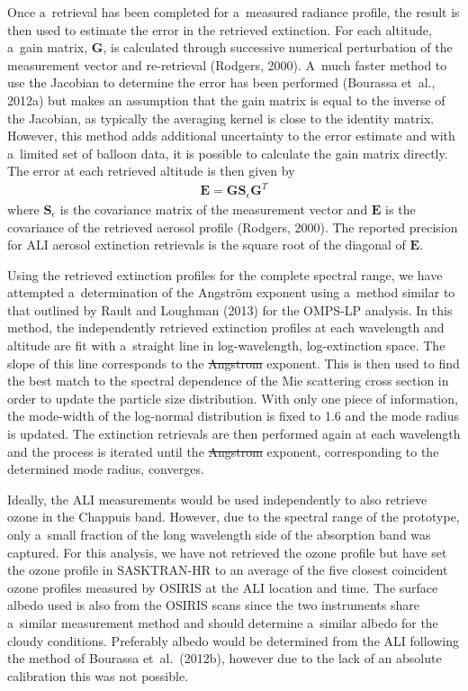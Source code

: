 \documentclass[amtd, online, hvmath]{copernicus}
\providecommand{\DIFadd}[1]{{\protect\color{blue}\uwave{#1}}} %
\providecommand{\DIFdel}[1]{{\protect\color{red}\sout{#1}}}                      %
\providecommand{\DIFaddbegin}{} %
\providecommand{\DIFaddend}{} %
\providecommand{\DIFdelbegin}{} %
\providecommand{\DIFdelend}{} %
\begin{document}
Once a~retrieval has been completed for a~measured radiance profile,
the result is then used to estimate the error in the retrieved
extinction. For each altitude, a~gain matrix, $\mathbf{G}$, is
calculated through successive numerical perturbation of the
measurement vector and re-retrieval (Rodgers, 2000). A~much faster
method to use the Jacobian to determine the error has been performed
(Bourassa et~al., 2012a) but makes an assumption that the gain matrix
is equal to the inverse of the Jacobian, as typically the averaging
kernel is close to the identity matrix. However, this method adds
additional uncertainty to the error estimate and with a~limited set of
balloon data, it is possible to calculate the gain matrix
directly. The error at each retrieved altitude is then given by
\begin{align}
\mathbf{E}=\mathbf{G}\mathbf{S}_{\epsilon} \mathbf{G}^{T}
\end{align}
where $\mathbf{S}_{\epsilon}$ is the covariance matrix of the
measurement vector and $\mathbf{E}$ is the covariance of the retrieved
aerosol profile (Rodgers, 2000). The reported precision for ALI
aerosol extinction retrievals is the square root of the diagonal of
$\mathbf{E}$.

Using the retrieved extinction profiles for the complete spectral
range, we have attempted a~determination of the Angstr\"{o}m exponent
using a~method similar to that outlined by Rault and Loughman (2013)
for the OMPS-LP analysis. In this method, the independently retrieved
extinction profiles at each wavelength and altitude are fit with
a~straight line in log-wavelength, log-extinction space. The slope of
this line corresponds to the \DIFdelbegin \DIFdel{Angstrom }\DIFdelend \DIFaddbegin \DIFadd{Angstr\"{o}m }\DIFaddend exponent. This is then used to
find the best match to the spectral dependence of the Mie scattering
cross section in order to update the particle size distribution. With
only one piece of information, the mode-width of the log-normal
distribution is fixed to 1.6 and the mode radius is updated. The
extinction retrievals are then performed again at each wavelength and
the process is iterated until the \DIFdelbegin \DIFdel{Angstrom }\DIFdelend \DIFaddbegin \DIFadd{Angstr\"{o}m }\DIFaddend exponent, corresponding to
the determined mode radius, converges.

Ideally, the ALI measurements would be used independently to also
retrieve ozone in the Chappuis band. However, due to the spectral
range of the prototype, only a~small fraction of the long wavelength
side of the absorption band was captured. For this analysis, we have
not retrieved the ozone profile but have set the ozone profile in
SASKTRAN-HR to an average of the five closest coincident ozone
profiles measured by OSIRIS at the ALI location and time. The surface
albedo used is also from the OSIRIS scans since the two instruments
share a~similar measurement method and should determine a~similar
albedo for the cloudy conditions. Preferably albedo would be
determined from the ALI following the method of Bourassa
et~al.~(2012b), however due to the lack of an absolute calibration
this was not possible.
\end{document}
